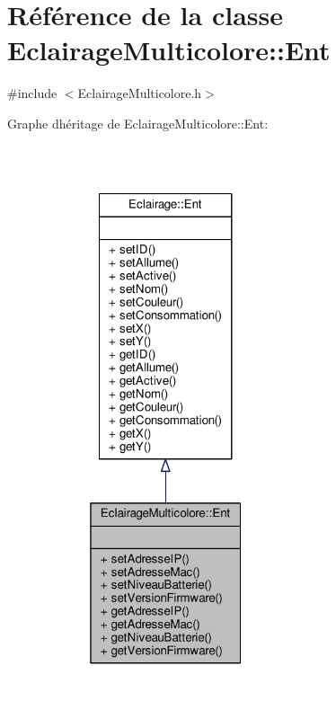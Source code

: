 \hypertarget{classEclairageMulticolore_1_1Ent}{}\section{Référence de la classe Eclairage\+Multicolore\+:\+:Ent}
\label{classEclairageMulticolore_1_1Ent}


{\ttfamily \#include $<$Eclairage\+Multicolore.\+h$>$}



Graphe d\textquotesingle{}héritage de Eclairage\+Multicolore\+:\+:Ent\+:\nopagebreak
\begin{figure}[H]
\begin{center}
\leavevmode
\includegraphics[width=205pt]{classEclairageMulticolore_1_1Ent__inherit__graph}
\end{center}
\end{figure}


